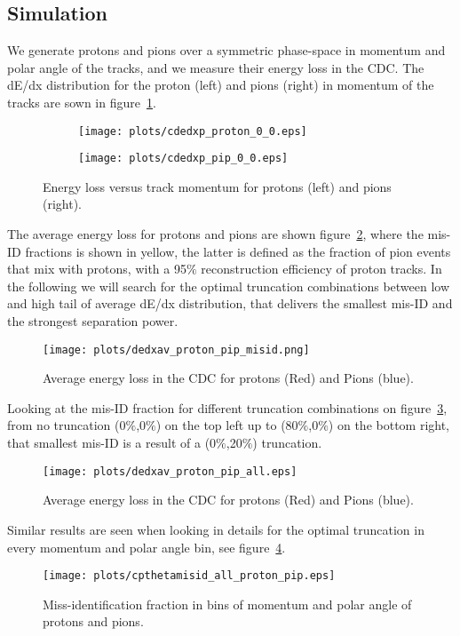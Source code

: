 \subsection{Simulation}
We generate protons and pions over a symmetric phase-space in momentum and polar angle of the tracks, and we measure their energy loss in the CDC. The dE/dx distribution for the proton (left) and pions (right) in momentum of the tracks are sown in figure~\ref{fig.3.4}.
\begin{figure}[H]
    \centering
    \begin{subfigure}[b]{0.45\textwidth}
        \texttt{[image: plots/cdedxp\_proton\_0\_0.eps]}
    \end{subfigure}\hfill
    \begin{subfigure}[b]{0.45\textwidth}
        \texttt{[image: plots/cdedxp\_pip\_0\_0.eps]}
    \end{subfigure}
    \caption{Energy loss versus track momentum for protons (left) and pions (right).}
    \label{fig.3.4}
\end{figure}
The average energy loss for protons and pions are shown figure~\ref{fig.3.5}, where the mis-ID fractions is shown in yellow, the latter is defined as the fraction of pion events that mix with protons, with a 95$\%$ reconstruction efficiency of proton tracks. In the following we will search for the optimal truncation combinations between low and high tail of average dE/dx distribution, that delivers the smallest mis-ID and the strongest separation power.
\begin{figure}[H]
    \centering
    \texttt{[image: plots/dedxav\_proton\_pip\_misid.png]}
    \caption{\label{fig.3.5}Average energy loss in the CDC for protons (Red) and Pions (blue).}
\end{figure}
Looking at the mis-ID fraction for different truncation combinations on figure~\ref{fig.3.6}, from no truncation (0$\%$,0$\%$) on the top left up to (80$\%$,0$\%$) on the bottom right, that smallest mis-ID is a result of a (0$\%$,20$\%$) truncation.
\begin{figure}[H]
    \centering
    \texttt{[image: plots/dedxav\_proton\_pip\_all.eps]}
    \caption{\label{fig.3.6}Average energy loss in the CDC for protons (Red) and Pions (blue).}
\end{figure}
Similar results are seen when looking in details for the optimal truncation in every momentum and polar angle bin, see figure~\ref{fig.3.7}.
\begin{figure}[H]
    \centering
    \texttt{[image: plots/cpthetamisid\_all\_proton\_pip.eps]}
    \caption{\label{fig.3.7}Miss-identification fraction in bins of momentum and polar angle of protons and pions.}
\end{figure}
